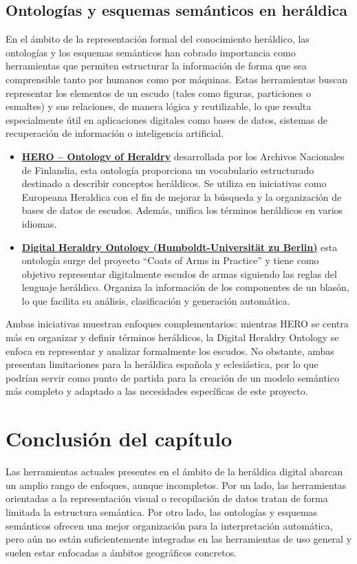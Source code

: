 \subsection{Ontologías y esquemas semánticos en heráldica}
En el ámbito de la representación formal del conocimiento heráldico, las ontologías y los esquemas 
semánticos han cobrado importancia como herramientas que permiten estructurar la información de
forma que sea comprensible tanto por humanos como por máquinas. Estas herramientas buscan representar
los elementos de un escudo (tales como figuras, particiones o esmaltes) y sus relaciones, de manera
lógica y reutilizable, lo que resulta especialmente útil en aplicaciones digitales como bases de 
datos, sistemas de recuperación de información o inteligencia artificial.

\begin{itemize}
    \item \textbf{\href{https://finto.fi/en/ontology/heraldica/}{HERO – Ontology of Heraldry}} desarrollada por los Archivos Nacionales de Finlandia, 
    esta ontología proporciona un vocabulario estructurado destinado a describir conceptos heráldicos.
    Se utiliza en iniciativas como Europeana Heraldica con el fin de mejorar la búsqueda y la organización
    de bases de datos de escudos. Además, unifica los términos heráldicos en varios idiomas.
    \item \textbf{\href{https://digitalheraldry.org/digital-heraldry-ontology/heraldry/documentation/index-en.html}{Digital Heraldry Ontology (Humboldt-Universität zu Berlin)}} esta ontología surge del
    proyecto “Coats of Arms in Practice” y tiene como objetivo representar digitalmente escudos de armas
    siguiendo las reglas del lenguaje heráldico. Organiza la información de los componentes de un blasón,
    lo que facilita su análisis, clasificación y generación automática.
\end{itemize}

Ambas iniciativas muestran enfoques complementarios: mientras HERO se centra más en organizar y
definir términos heráldicos, la Digital Heraldry Ontology se enfoca en representar y analizar
formalmente los escudos. No obstante, ambas presentan limitaciones para la heráldica española y
eclesiástica, por lo que podrían servir como punto de partida para la creación de un modelo semántico
más completo y adaptado a las necesidades específicas de este proyecto.

\section{Conclusión del capítulo}
Las herramientas actuales presentes en el ámbito de la heráldica digital abarcan un amplio
rango de enfoques, aunque incompletos. Por un lado, las herramientas orientadas a la representación
visual o recopilación de datos tratan de forma limitada la estructura semántica. Por otro lado,
las ontologías y esquemas semánticos ofrecen una mejor organización para la interpretación
automática, pero aún no están suficientemente integradas en las herramientas de uso general y
suelen estar enfocadas a ámbitos geográficos concretos. 

